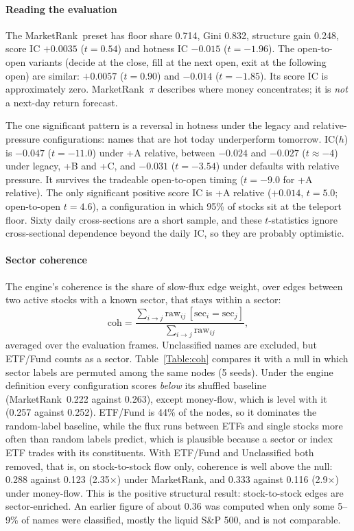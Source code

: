 \documentclass[preprint,3p,twocolumn]{elsarticle}
\newcommand{\MR}{MarketRank}
\begin{document}
\paragraph{Reading the evaluation} The \MR\ preset has floor share 0.714, Gini 0.832, structure gain 0.248, score IC $+0.0035$ ($t=0.54$) and hotness IC $-0.015$ ($t=-1.96$). The open-to-open variants (decide at the close, fill at the next open, exit at the following open) are similar: $+0.0057$ ($t=0.90$) and $-0.014$ ($t=-1.85$). Its score IC is approximately zero. \MR\ $\pi$ describes where money concentrates; it is \emph{not} a next-day return forecast.

The one significant pattern is a reversal in hotness under the legacy and relative-pressure configurations: names that are hot today underperform tomorrow. IC($h$) is $-0.047$ ($t=-11.0$) under +A relative, between $-0.024$ and $-0.027$ ($t\approx-4$) under legacy, +B and +C, and $-0.031$ ($t=-3.54$) under defaults with relative pressure. It survives the tradeable open-to-open timing ($t=-9.0$ for +A relative). The only significant positive score IC is +A relative ($+0.014$, $t=5.0$; open-to-open $t=4.6$), a configuration in which 95\% of stocks sit at the teleport floor. Sixty daily cross-sections are a short sample, and these $t$-statistics ignore cross-sectional dependence beyond the daily IC, so they are probably optimistic.

\paragraph{Sector coherence} The engine's coherence is the share of slow-flux edge weight, over edges between two active stocks with a known sector, that stays within a sector:
\[
\mathrm{coh}=\frac{\sum_{i\to j}\mathrm{raw}_{ij}\,[\mathrm{sec}_i=\mathrm{sec}_j]}{\sum_{i\to j}\mathrm{raw}_{ij}},
\]
averaged over the evaluation frames. Unclassified names are excluded, but ETF/Fund counts as a sector. Table~\ref{Table:coh} compares it with a null in which sector labels are permuted among the same nodes (5 seeds). Under the engine definition every configuration scores \emph{below} its shuffled baseline (\MR\ 0.222 against 0.263), except money-flow, which is level with it (0.257 against 0.252). ETF/Fund is 44\% of the nodes, so it dominates the random-label baseline, while the flux runs between ETFs and single stocks more often than random labels predict, which is plausible because a sector or index ETF trades with its constituents. With ETF/Fund and Unclassified both removed, that is, on stock-to-stock flow only, coherence is well above the null: 0.288 against 0.123 (2.35$\times$) under \MR, and 0.333 against 0.116 (2.9$\times$) under money-flow. This is the positive structural result: stock-to-stock edges are sector-enriched. An earlier figure of about 0.36 was computed when only some 5--9\% of names were classified, mostly the liquid S\&P 500, and is not comparable.
\end{document}
